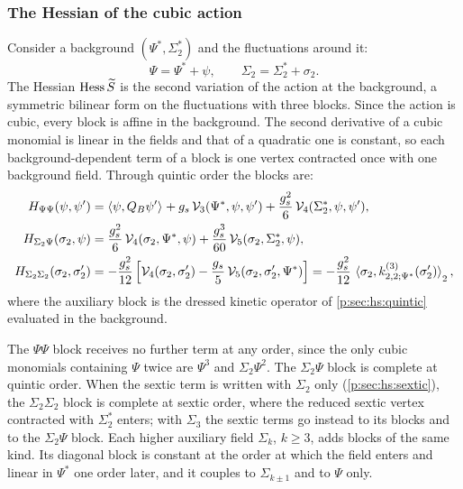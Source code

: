 \subsubsection{The Hessian of the cubic action}
\label{p:sec:sol:hessian}


Consider a background $(\Psi^*, \Sigma_2^*)$ and the fluctuations around it:
\begin{equation}
  \label{p:eq:sol:fluctuations}
  \Psi
    = \Psi^* + \psi,
  \qquad
  \Sigma_2
    = \Sigma_2^* + \sigma_2.
\end{equation}
The Hessian $\operatorname{Hess} \widetilde{S}_{}$ is the second variation of the action at the background, a symmetric bilinear form on the fluctuations with three blocks.
Since the action is cubic, every block is affine in the background.
The second derivative of a cubic monomial is linear in the fields and that of a quadratic one is constant, so each background-dependent term of a block is one vertex contracted once with one background field.
Through quintic order the blocks are:
\begin{subequations}
  \label{p:eq:sol:hessian-blocks}
  \begin{align}
    \label{p:eq:sol:H-psi-psi}
    H_{\Psi \Psi}(\psi, \psi')
      &
      = \pair{\psi}{Q_B \psi'}
        + \gs \, \vertex{3}(\Psi^*, \psi, \psi')
        + \frac{\gs^2}{6} \, \vertex{4}(\Sigma_2^*, \psi, \psi'),
    \\
    \label{p:eq:sol:H-sigma-psi}
    H_{\Sigma_2 \Psi}(\sigma_2, \psi)
      &
      = \frac{\gs^2}{6} \, \vertex{4}(\sigma_2, \Psi^*, \psi)
        + \frac{\gs^3}{60} \, \vertex{5}(\sigma_2, \Sigma_2^*, \psi),
    \\
    \label{p:eq:sol:H-sigma-sigma}
    H_{\Sigma_2 \Sigma_2}(\sigma_2, \sigma_2')
      &
      = - \frac{\gs^2}{12} \, \Big[
          \vertex{4}(\sigma_2, \sigma_2')
          - \frac{\gs}{5} \, \vertex{5}(\sigma_2, \sigma_2', \Psi^*)
        \Big]
      = - \frac{\gs^2}{12} \, \pair[2]{\sigma_2}{\kin{2}{\Psi^*}{3}(\sigma_2')},
  \end{align}
\end{subequations}
where the auxiliary block is the dressed kinetic operator of \cref{p:sec:hs:quintic} evaluated in the background.

The $\Psi \Psi$ block receives no further term at any order, since the only cubic monomials containing $\Psi$ twice are $\Psi^3$ and $\Sigma_2 \Psi^2$.
The $\Sigma_2 \Psi$ block is complete at quintic order.
  When the sextic term is written with $\Sigma_2$ only (\cref{p:sec:hs:sextic}), the $\Sigma_2 \Sigma_2$ block is complete at sextic order, where the reduced sextic vertex contracted with $\Sigma_2^*$ enters; with $\Sigma_3$ the sextic terms go instead to its blocks and to the $\Sigma_2 \Psi$ block.
  Each higher auxiliary field $\Sigma_k$, $k \ge 3$, adds blocks of the same kind.
Its diagonal block is constant at the order at which the field enters and linear in $\Psi^*$ one order later, and it couples to $\Sigma_{k \pm 1}$ and to $\Psi$ only.


